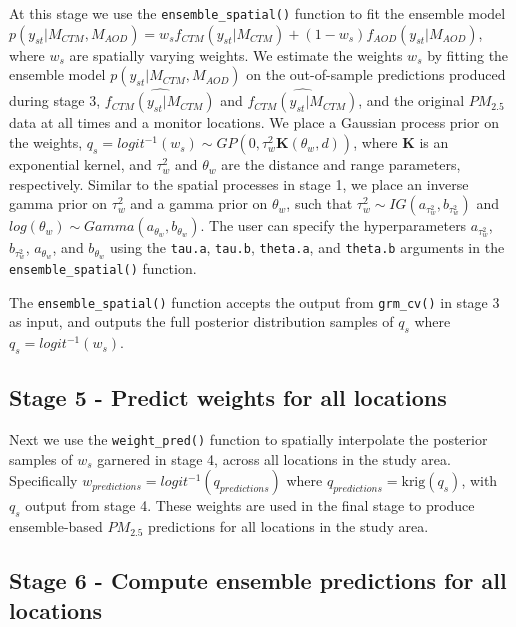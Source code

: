 \documentclass[12pt]{article}
\newcommand{\bl}{\mathbf}
\begin{document}
At this stage we use the \texttt{ensemble\_spatial()} function to fit the ensemble model  $p(y_{st} | M_{CTM}, M_{AOD}) = w_s f_{CTM}(y_{st} | M_{CTM}) + (1-w_s) f_{AOD}(y_{st}|M_{AOD})$, where $w_s$ are spatially varying weights.
We estimate the weights $w_s$ by fitting the ensemble model $p(y_{st} | M_{CTM}, M_{AOD})$ on the out-of-sample predictions produced during stage 3, $\widehat{f_{CTM}(y_{st} | M_{CTM})}$ and $\widehat{f_{CTM}(y_{st} | M_{CTM})}$, and the original $PM_{2.5}$ data at all times and a monitor locations.
We place a Gaussian process prior on the weights, $q_s = logit^{-1}(w_s) \sim GP(0, \tau^2_w  \bl{K}(\theta_w, d))$, where $\bl{K}$ is an exponential kernel, and $\tau^2_w$ and $\theta_w$ are the distance and range parameters, respectively.
Similar to the spatial processes in stage 1, we place an inverse gamma prior on $\tau^2_w$ and a gamma prior on $\theta_w$, such that $\tau^2_w \sim IG(a_{\tau^2_w}, b_{\tau^2_w})$ and $log(\theta_w) \sim Gamma(a_{\theta_w}, b_{\theta_w})$.
The user can specify the hyperparameters $a_{\tau^2_w}$, $b_{\tau^2_w}$, $a_{\theta_w}$, and $b_{\theta_w}$ using the \texttt{tau.a}, \texttt{tau.b}, \texttt{theta.a}, and \texttt{theta.b} arguments in the \texttt{ensemble\_spatial()} function.

The \texttt{ensemble\_spatial()} function accepts the output from \texttt{grm\_cv()} in stage 3 as input, and outputs the full posterior distribution samples of $q_s$ where $q_s = logit^{-1}(w_s)$. 

\subsection*{Stage 5 - Predict weights for all locations}

Next we use the \texttt{weight\_pred()} function to spatially interpolate the posterior samples of $w_s$ garnered in stage 4, across all locations in the study area. 
Specifically $w_{predictions} = logit^{-1}(q_{predictions})$ where $q_{predictions} = \text{krig}(q_s)$, with $q_s$ output from stage 4.
These weights are used in the final stage to produce ensemble-based $PM_{2.5}$ predictions for all locations in the study area.





\subsection*{Stage 6 - Compute ensemble predictions for all locations}
\end{document}
